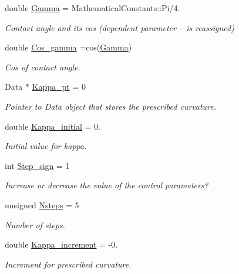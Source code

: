 \begin{DoxyCompactItemize}
double \hyperlink{namespaceGlobalParameters_adb0a994119055242fcc762cac5edc317}{Gamma} = Mathematical\+Constants\+::\+Pi/4.
\begin{DoxyCompactList}\small\item\em Contact angle and its cos (dependent parameter -- is reassigned) \end{DoxyCompactList}\item 
double \hyperlink{namespaceGlobalParameters_ae982fcb894e82c683d07d3c2fbbead3d}{Cos\+\_\+gamma} =cos(\hyperlink{namespaceGlobalParameters_adb0a994119055242fcc762cac5edc317}{Gamma})
\begin{DoxyCompactList}\small\item\em Cos of contact angle. \end{DoxyCompactList}\item 
Data $\ast$ \hyperlink{namespaceGlobalParameters_ac6234184cce40ab2c6bec92b37e4ae41}{Kappa\+\_\+pt} = 0
\begin{DoxyCompactList}\small\item\em Pointer to Data object that stores the prescribed curvature. \end{DoxyCompactList}\item 
double \hyperlink{namespaceGlobalParameters_ae7651e73d3f8346da9fcfdbb149bc22e}{Kappa\+\_\+initial} = 0.
\begin{DoxyCompactList}\small\item\em Initial value for kappa. \end{DoxyCompactList}\item 
int \hyperlink{namespaceGlobalParameters_aeb81cc1c282502497ef6df576559b650}{Step\+\_\+sign} = 1
\begin{DoxyCompactList}\small\item\em Increase or decrease the value of the control parameters? \end{DoxyCompactList}\item 
unsigned \hyperlink{namespaceGlobalParameters_aa6c94936d7c81286bb747e14a90d7ba0}{Nsteps} = 5
\begin{DoxyCompactList}\small\item\em Number of steps. \end{DoxyCompactList}\item 
double \hyperlink{namespaceGlobalParameters_a74cc88d6dc206cd556fb12e7e3101032}{Kappa\+\_\+increment} = -\/0.
\begin{DoxyCompactList}\small\item\em Increment for prescribed curvature. \end{DoxyCompactList}\item 

\end{DoxyCompactItemize}

